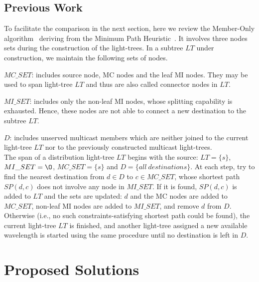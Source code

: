 \documentclass[conference]{IEEEtran}
\begin{document}
\subsection{Previous Work}
\label{subsec: Previous Work}
To facilitate the comparison in the next section, here we review the Member-Only algorithm~\cite{xjzhang2000} deriving from the Minimum Path Heuristic~\cite{hTakahashi1980}. It involves three nodes sets during the construction of the light-trees. In a subtree $LT$ under construction, we maintain the following sets of nodes.

   $MC\_SET$: includes source node, MC nodes and the leaf MI nodes. They may be used to span light-tree $LT$ and thus are also called connector nodes in $LT$.

   $MI\_SET$: includes only the non-leaf MI nodes, whose splitting capability is exhausted. Hence, these nodes are not able to connect a new destination to the subtree $LT$.

   $D$: includes unserved multicast members which are neither joined to the current light-tree $LT$ nor to the previously constructed multicast light-trees.\\

The span of a distribution light-tree $LT$ begins with the source: $LT=\{s\}$, $MI\_SET=\O$, $MC\_SET=\{s\}$ and $D=\{all~destinations\}$. At each step, try to find the nearest destination from $d \in D$ to $c \in MC\_SET$, whose shortest path $SP(d, c)$ does not involve any node in $MI\_SET$. If it is found, $SP(d, c)$ is added to $LT$ and the sets are updated: $d$ and the MC nodes are added to $MC\_SET$, non-leaf MI nodes are added to $MI\_SET$, and remove $d$ from $D$. Otherwise (i.e., no such constraints-satisfying shortest path could be found), the current light-tree $LT$ is finished, and another light-tree assigned a new available wavelength is started using the same procedure until no destination is left in $D$.

\section{Proposed Solutions}
\label{sec: Proposed Solutions}
\end{document}
